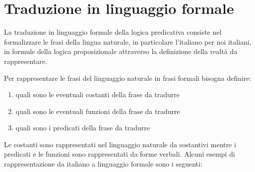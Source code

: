 \section{Traduzione in linguaggio formale}
La traduzione in linguaggio formale della logica predicativa consiste nel formalizzare
le frasi della lingua naturale, in particolare l'italiano per noi italiani, in
formule della logica proposizionale attraverso la definizione della realtà da rappresentare.

Per rappresentare le frasi del linguaggio naturale in frasi formali bisogna definire:
\begin{enumerate}
    \item quali sono le eventuali costanti della frase da tradurre
    \item quali sono le eventuali funzioni della frase da tradurre
    \item quali sono i predicati della frase da tradurre
\end{enumerate}

Le costanti sono rappresentati nel linguaggio naturale da sostantivi mentre i
predicati e le funzioni sono rappresentati da forme verbali.
Alcuni esempi di rappresentazione da italiano a linguaggio formale sono i seguenti:



